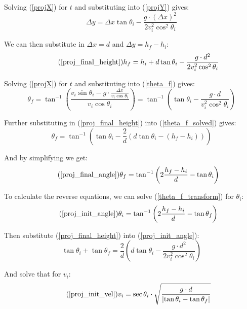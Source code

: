 \documentclass[11pt,a4paper,titlepage]{article}
\begin{document}
	Solving (\ref{projX}) for $t$ and substituting into (\ref{projY}) gives:
	\begin{equation}
		\Delta y = \Delta x \tan \theta_i - \frac{g \cdot (\Delta x)^2}{2 v_i^2 \cos^2 \theta_i}
	\end{equation}
	
	We can then substitute in $\Delta x = d$ and $\Delta y = h_f - h_i$:
	\begin{equation} \tag{\ref*{proj_final_height}}
		h_f = h_i + d \tan \theta_i - \frac{g \cdot d^2}{2 v_i^2 \cos^2 \theta_i}
	\end{equation}
	
	Solving (\ref{projX}) for $t$ and substituting into (\ref{theta_f}) gives:
	\begin{equation} \label{theta_f_solved}
		\theta_f = \tan^{-1} \left( \frac{v_i \sin \theta_i - g \cdot \frac{\Delta x}{v_i \cos \theta_i}}{v_i \cos \theta_i} \right) = \tan^{-1} \left( \tan \theta_i - \frac{g \cdot d}{v_i^2 \cos^2 \theta_i} \right)
	\end{equation}
	
	Further substituting in (\ref{proj_final_height}) into (\ref{theta_f_solved}) gives:
	\begin{equation} \label{theta_f_transform}
		\theta_f = \tan^{-1} \left( \tan \theta_i - \frac{2}{d} (d \tan \theta_i - (h_f - h_i)) \right)
	\end{equation}
	
	And by simplifying we get:
	\begin{equation} \tag{\ref*{proj_final_angle}}
		\theta_f = \tan^{-1} \left( 2 \frac{h_f - h_i}{d} - \tan \theta_i \right)
	\end{equation}
	
	To calculate the reverse equations, we can solve (\ref{theta_f_transform}) for $\theta_i$:
	\begin{equation} \tag{\ref*{proj_init_angle}}
		\theta_i = \tan^{-1} \left( 2 \frac{h_f - h_i}{d} - \tan \theta_f \right)
	\end{equation}
	
	Then substitute (\ref{proj_final_height}) into (\ref{proj_init_angle}):
	\begin{equation}
		\tan \theta_i + \tan \theta_f = \frac{2}{d} \left( d \tan \theta_i - \frac{g \cdot d^2}{2 v_i^2 \cos^2 \theta_i} \right)
	\end{equation}
	
	And solve that for $v_i$:
	\begin{equation} \tag{\ref*{proj_init_vel}}
		v_i = \sec \theta_i \cdot \sqrt{\frac{g \cdot d}{\left| \tan \theta_i - \tan \theta_f \right|}}
	\end{equation}
	
\end{document}
